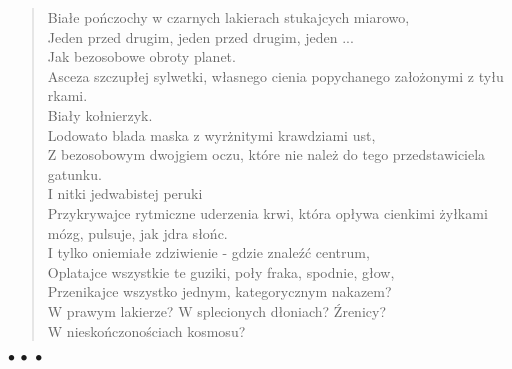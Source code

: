 \documentclass{article} %
\newenvironment{wiersz}[1]
	{\begin{verse} \hspace*{-1em}{\bf #1}}
	{\end{verse} \begin{center}$\bullet\ \bullet\ \bullet$\end{center}}
\newcommand{\e}{\eob}
\renewcommand{\a}{\aob}
\renewcommand{\o}{\'{o}}
\newcommand{\z}{\'{z}}
\newcommand{\n}{\'{n}}
\newcommand{\s}{\'{s}}
\newcommand{\ci}{\'{c}}
\newcommand{\Z}{\'{Z}}
\begin{document}
\begin{wiersz}  
{Porter Kanta \\*[1ex]}
Bia{\l}e po{\n}czochy w czarnych lakierach stukaj{\a}cych miarowo, \\ 
Jeden przed drugim, jeden przed drugim, jeden ... \\ 
Jak bezosobowe obroty planet. \\ 
Asceza szczup{\l}ej sylwetki, w{\l}asnego cienia popychanego za{\l}o\.{z}onymi z ty{\l}u r{\e}kami. \\ 
Bia{\l}y ko{\l}nierzyk. \\ 
Lodowato blada maska z wyr\.{z}ni{\e}tymi kraw{\e}dziami ust, \\ 
Z bezosobowym dwojgiem oczu, kt{\o}re nie nale\.{z}{\a} do tego 
  przed\-sta\-wi\-cie\-la gatunku. \\ 
I nitki jedwabistej peruki \\ 
Przykrywaj{\a}ce rytmiczne uderzenia krwi, kt{\o}ra op{\l}ywa cienkimi \.{z}y{\l}kami m{\o}zg, pulsuje, jak j{\a}dra s{\l}o{\n}c. \\ 
I tylko oniemia{\l}e zdziwienie - gdzie znale{\z}{\ci} centrum, \\ 
Oplataj{\a}ce wszystkie te guziki, po{\l}y fraka, spodnie, g{\l}ow{\e}, \\ 
Przenikaj{\a}ce wszystko jednym, kategorycznym nakazem? \\ 
W prawym lakierze? W splecionych d{\l}oniach? {\Z}renicy? \\ 
W niesko{\n}czono{\s}ciach kosmosu?  \\ 

\end{wiersz}
\end{document}
